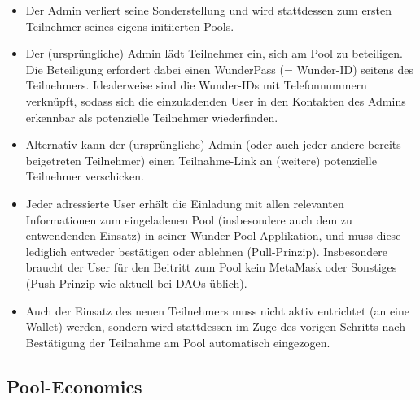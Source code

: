 \begin{itemize}
	\item Der Admin verliert seine Sonderstellung und wird stattdessen zum ersten Teilnehmer seines eigens initiierten Pools. 
	\item Der (ursprüngliche) Admin lädt Teilnehmer ein, sich am Pool zu beteiligen. Die Beteiligung erfordert dabei einen WunderPass (= Wunder-ID) seitens des Teilnehmers. Idealerweise sind die Wunder-IDs mit Telefonnummern verknüpft, sodass sich die einzuladenden User in den Kontakten des Admins erkennbar als potenzielle Teilnehmer wiederfinden.
	\item Alternativ kann der (ursprüngliche) Admin (oder auch jeder andere bereits beigetreten Teilnehmer) einen Teilnahme-Link an (weitere) potenzielle Teilnehmer verschicken.
	\item Jeder adressierte User erhält die Einladung mit allen relevanten Informationen zum eingeladenen Pool (insbesondere auch dem zu entwendenden Einsatz) in seiner Wunder-Pool-Applikation, und muss diese lediglich entweder bestätigen oder ablehnen (Pull-Prinzip). Insbesondere braucht der User für den Beitritt zum Pool kein MetaMask oder Sonstiges (Push-Prinzip wie aktuell bei DAOs üblich). 
	\item Auch der Einsatz des neuen Teilnehmers muss nicht aktiv entrichtet (an eine Wallet) werden, sondern wird stattdessen im Zuge des vorigen Schritts nach Bestätigung der Teilnahme am Pool automatisch eingezogen.
\end{itemize}

\vspace{0.3cm}


\vspace{0.3cm}


\vspace{0.5cm}

\subsection{Pool-Economics}

\vspace{0.3cm}





